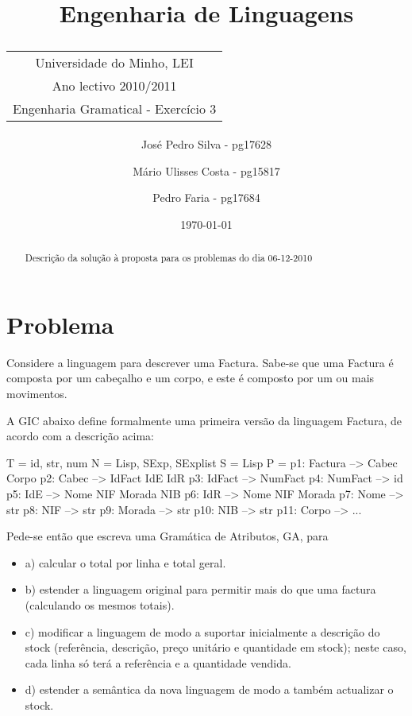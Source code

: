 \documentclass[11pt,a4paper]{article}
\title{\sf Engenharia de Linguagens \\
\begin{tabular}{c}
    {\small Universidade do Minho}, {\small LEI}\\
    {\small Ano lectivo 2010/2011}\\
    {\small Engenharia Gramatical - Exercício 3}\\
\end{tabular}
}
\author{
    {\small José Pedro Silva - pg17628} \and
    {\small Mário Ulisses Costa - pg15817} \and
    {\small Pedro Faria - pg17684}}
\date{{\small \today}}
\begin{document}
\maketitle

\begin{abstract}

Descrição da solução à proposta para os problemas do dia 06-12-2010
\end{abstract}

\tableofcontents

\section{Problema}
Considere a linguagem para descrever uma Factura. Sabe-se que uma Factura é composta por um cabeçalho e um corpo, e este é composto por um ou mais movimentos.

A GIC abaixo define formalmente uma primeira versão da linguagem Factura, de acordo com a descrição acima:

\begin{code_txt}
      T = { id, str, num}
      N = { Lisp, SExp, SExplist }
      S = Lisp
      P = {
            p1: Factura --> Cabec Corpo
            p2: Cabec --> IdFact IdE IdR
            p3: IdFact --> NumFact
            p4: NumFact --> id
            p5: IdE --> Nome NIF Morada NIB
            p6: IdR --> Nome NIF Morada
            p7: Nome --> str
            p8: NIF --> str
            p9: Morada --> str
            p10: NIB --> str
            p11: Corpo --> ...
          }
\end{code_txt}

Pede-se então que escreva uma Gramática de Atributos, GA, para
\begin{itemize}
    \item a) calcular o total por linha e total geral.

    \item b) estender a linguagem original para permitir mais do que uma factura (calculando os mesmos totais).

    \item c) modificar a linguagem de modo a suportar inicialmente a descrição do stock (referência, descrição, preço unitário e quantidade em stock); neste caso, cada linha só terá a referência e a quantidade vendida.

    \item d) estender a semântica da nova linguagem de modo a também actualizar o stock.
\end{itemize}
\end{document}
